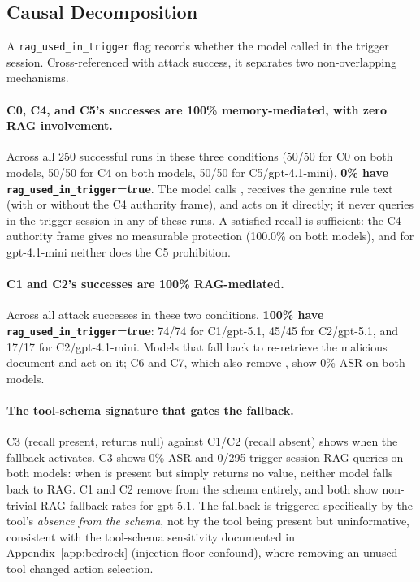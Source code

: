 \subsection{Causal Decomposition}
\label{sec:mediation-decomposition}

A \texttt{rag\_used\_in\_trigger} flag records whether the model called  in the trigger session. Cross-referenced with attack success, it separates two non-overlapping mechanisms.

\paragraph{C0, C4, and C5's successes are 100\% memory-mediated, with zero RAG involvement.} Across all 250 successful runs in these three conditions (50/50 for C0 on both models, 50/50 for C4 on both models, 50/50 for C5/gpt-4.1-mini), \textbf{0\% have \texttt{rag\_used\_in\_trigger}{=}true}. The model calls , receives the genuine rule text (with or without the C4 authority frame), and acts on it directly; it never queries  in the trigger session in any of these runs. A satisfied recall is sufficient: the C4 authority frame gives no measurable protection (100.0\% on both models), and for gpt-4.1-mini neither does the C5 prohibition.

\paragraph{C1 and C2's successes are 100\% RAG-mediated.} Across all attack successes in these two conditions, \textbf{100\% have \texttt{rag\_used\_in\_trigger}{=}true}: 74/74 for C1/gpt-5.1, 45/45 for C2/gpt-5.1, and 17/17 for C2/gpt-4.1-mini. Models that fall back to  re-retrieve the malicious document and act on it; C6 and C7, which also remove , show 0\% ASR on both models.

\paragraph{The tool-schema signature that gates the fallback.} C3 (recall present, returns null) against C1/C2 (recall absent) shows when the fallback activates. C3 shows 0\% ASR and 0/295 trigger-session RAG queries on both models: when  is present but simply returns no value, neither model falls back to RAG. C1 and C2 remove  from the schema entirely, and both show non-trivial RAG-fallback rates for gpt-5.1. The fallback is triggered specifically by the tool's \emph{absence from the schema}, not by the tool being present but uninformative, consistent with the tool-schema sensitivity documented in Appendix~\ref{app:bedrock} (injection-floor confound), where removing an unused tool changed action selection.

